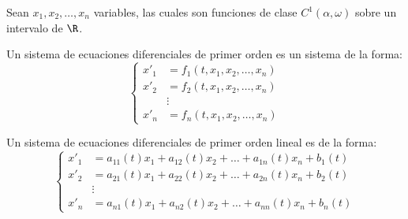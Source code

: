\documentclass[../main.tex]{subfiles}
\begin{document}
Sean \(x_1, x_2, \dots, x_n\) variables, las cuales son funciones de clase 
\(C^1(\alpha, \omega)\) sobre un intervalo de \(\R\).

\begin{definition}
	Un sistema de ecuaciones diferenciales de primer orden es un sistema de la
	forma:
	\[\begin{cases}
			x'_1 &= f_1(t, x_1, x_2, \dots, x_n) \\
			x'_2 &= f_2(t, x_1, x_2, \dots, x_n) \\
				 &\vdots \\
			x'_n &= f_n(t, x_1, x_2, \dots, x_n)
	  \end{cases}\]
\end{definition}

\begin{definition}
	Un sistema de ecuaciones diferenciales de primer orden lineal es de la
	forma:
	\[\begin{cases}
		x'_1 &= a_{11}(t)x_1 + a_{12}(t)x_2 + \dots + a_{1n}(t)x_n + b_1(t) \\
		x'_2 &= a_{21}(t)x_1 + a_{22}(t)x_2 + \dots + a_{2n}(t)x_n + b_2(t) \\
			 &\vdots \\
		x'_n &= a_{n1}(t)x_1 + a_{n2}(t)x_2 + \dots + a_{nn}(t)x_n + b_n(t)
	  \end{cases}\]
\end{definition}
\end{document}
